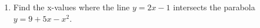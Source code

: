 \documentclass[11pt]{article}
\begin{document}
\begin{enumerate}
\item Find the x-values where the line $y = 2x-1$ intersects the parabola $y = 9 + 5x - x^2$. 
\vfill 

\setcounter{enumCount}{\theenumi}
\end{enumerate}
\end{document}

